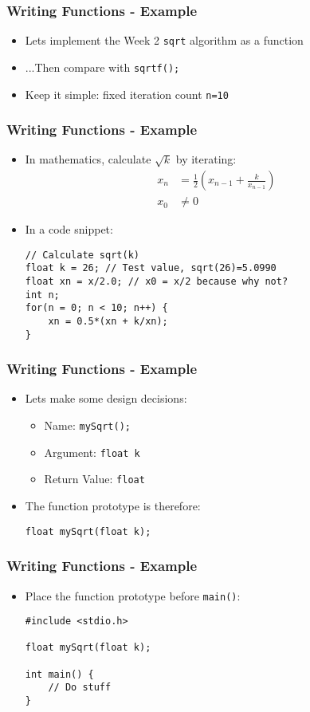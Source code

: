 \documentclass[14pt]{beamer}
\begin{document}
\begin{frame}[fragile]
\frametitle{Writing Functions - Example}
\begin{itemize}
\item Lets implement the Week 2 \texttt{sqrt} algorithm as a function
\item ...Then compare with \texttt{sqrtf();}
\item Keep it simple: fixed iteration count \texttt{n=10}

\end{itemize}
\end{frame}

\begin{frame}[fragile]
\frametitle{Writing Functions - Example}
\begin{itemize}
\item In mathematics, calculate $\sqrt{k}$ by iterating:
\begin{align*}
x_n &= \frac{1}{2}\left(x_{n-1} + \frac{k}{x_{n-1}}\right)\\
x_0 &\neq 0
\end{align*}
\item In a code snippet:
\begin{lstlisting}[style=CStyle]
// Calculate sqrt(k)
float k = 26; // Test value, sqrt(26)=5.0990
float xn = x/2.0; // x0 = x/2 because why not?
int n;
for(n = 0; n < 10; n++) {
	xn = 0.5*(xn + k/xn);
}
\end{lstlisting}
\end{itemize}
\end{frame}

\begin{frame}[fragile]
\frametitle{Writing Functions - Example}
\begin{itemize}
\item Lets make some design decisions:
	\begin{itemize}
		\item Name: \texttt{mySqrt();}
		\item Argument: \texttt{float k}
		\item Return Value: \texttt{float}
	\end{itemize}
\item The function prototype is therefore:
\begin{lstlisting}[style=CStyle]
float mySqrt(float k);
\end{lstlisting}
\end{itemize}
\end{frame}

\begin{frame}[fragile]
\frametitle{Writing Functions - Example}
\begin{itemize}
\item Place the function prototype before \texttt{main()}:
\begin{lstlisting}[style=CStyle]
#include <stdio.h>

float mySqrt(float k);

int main() {
	// Do stuff
}
\end{lstlisting}
\end{itemize}
\end{frame}
\end{document}
